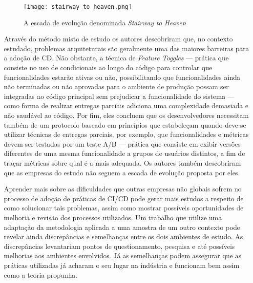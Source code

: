 \begin{figure*}
\texttt{[image: stairway\_to\_heaven.png]}
\caption[Stairway to Heaven]{
    A escada de evolução denominada \emph{Stairway to Heaven} \cite{empiricalStudy2016}
}\label{stairway}

\end{figure*}

Através do método misto de estudo os autores descobriram que, no contexto estudado, problemas arquiteturais são geralmente uma das maiores barreiras para a adoção de CD. Não obstante, a técnica de \emph{Feature Toggles} \cite{featureToggles} --- prática que consiste no uso de condicionais ao longo do código para controlar que funcionalidades estarão ativas ou não, possibilitando que funcionalidades ainda não terminadas ou não aprovadas para o ambiente de produção possam ser integradas no código principal sem prejudicar a funcionalidade do sistema  --- como forma de realizar entregas parciais adiciona uma complexidade demasiada e não saudável ao código. Por fim, eles concluem que os desenvolvedores necessitam também de um protocolo baseado em princípios que estabeleçam quando deve-se utilizar técnicas de entregas parciais, por exemplo, que funcionalidades e métricas devem ser testadas por um teste A/B \cite{testsAB} --- prática que consiste em exibir versões diferentes de uma mesma funcionalidade a grupos de usuários distintos, a fim de traçar métricas sobre qual é a mais adequada. Os autores também descobriram que as empresas do estudo não seguem a escada de evolução proposta por eles.

Aprender mais sobre as dificuldades que outras empresas não globais sofrem no processo de adoção de práticas de CI/CD pode gerar mais estudos a respeito de como solucionar tais problemas, assim como mostrar possíveis oportunidades de melhoria e revisão dos processos utilizados. Um trabalho que utilize uma adaptação da metodologia aplicada a uma amostra de um outro contexto pode revelar ainda discrepâncias e semelhanças entre os dois ambientes de estudo. As discrepâncias levantariam pontos de questionamento, pesquisa e até possíveis melhorias aos ambientes envolvidos. Já as semelhanças podem assegurar que as práticas utilizadas já acharam o seu lugar na indústria e funcionam bem assim como a teoria propunha.


